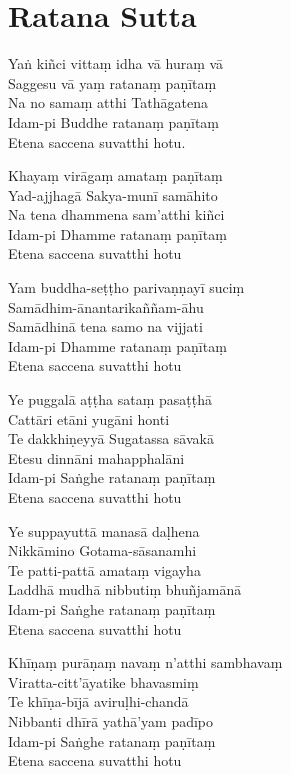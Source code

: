 \clearpage

\chapter{Ratana Sutta}%


\begin{paritta}
Yaṅ kiñci vittaṃ idha vā huraṃ vā\\
Saggesu vā yaṃ ratanaṃ paṇītaṃ\\
Na no samaṃ atthi Tathāgatena\\
Idam-pi Buddhe ratanaṃ paṇītaṃ\\
Etena saccena suvatthi hotu.

Khayaṃ virāgaṃ amataṃ paṇītaṃ\\
Yad-ajjhagā Sakya-munī samāhito\\
Na tena dhammena sam'atthi kiñci\\
Idam-pi Dhamme ratanaṃ paṇītaṃ\\
Etena saccena suvatthi hotu

Yam buddha-seṭṭho parivaṇṇayī suciṃ\\
Samādhim-ānantarikaññam-āhu\\
Samādhinā tena samo na vijjati\\
Idam-pi Dhamme ratanaṃ paṇītaṃ\\
Etena saccena suvatthi hotu

Ye puggalā aṭṭha sataṃ pasaṭṭhā\\
Cattāri etāni yugāni honti\\
Te dakkhiṇeyyā Sugatassa sāvakā\\
Etesu dinnāni mahapphalāni\\
Idam-pi Saṅghe ratanaṃ paṇītaṃ\\
Etena saccena suvatthi hotu

\enlargethispage{\baselineskip}

Ye suppayuttā manasā daḷhena\\
Nikkāmino Gotama-sāsanamhi\\
Te patti-pattā amataṃ vigayha\\
Laddhā mudhā nibbutiṃ bhuñjamānā\\
Idam-pi Saṅghe ratanaṃ paṇītaṃ\\
Etena saccena suvatthi hotu

Khīṇaṃ purāṇaṃ navaṃ n'atthi sambhavaṃ\\
Viratta-citt'āyatike bhavasmiṃ\\
Te khīṇa-bījā aviruḷhi-chandā\\
Nibbanti dhīrā yathā'yam padīpo\\
Idam-pi Saṅghe ratanaṃ paṇītaṃ\\
Etena saccena suvatthi hotu

\end{paritta}

